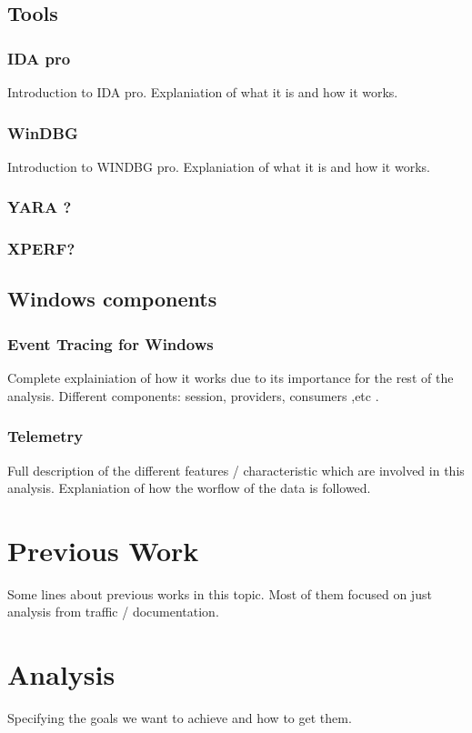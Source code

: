 \documentclass[11pt,a4paper,twoside]{tesis}
\begin{document}
\subsection*{Tools}
\subsubsection*{IDA pro}
Introduction to IDA pro. Explaniation of what it is and how it works.
\subsubsection*{WinDBG}
Introduction to WINDBG pro. Explaniation of what it is and how it works.
\subsubsection*{YARA ? }
\subsubsection*{XPERF? }

\subsection*{Windows components}
\subsubsection*{Event Tracing for Windows}
Complete explainiation of how it works due to its importance for the rest of the analysis. Different components: session, providers, consumers ,etc .
\subsubsection*{Telemetry}
Full description of the different features / characteristic which are involved in this analysis. Explaniation of how the worflow of the data is followed.


\section*{Previous Work}
Some lines about previous works in this topic. Most of them focused on just analysis from traffic / documentation. 

\section*{Analysis}
Specifying the goals we want to achieve and how to get them. 
\end{document}
